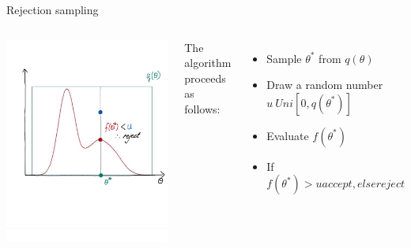\documentclass[compress]{beamer}
\begin{document}
\begin{frame}[label=sec-5-7]{Rejection sampling}
\begin{columns}[c] 
\includegraphics[width=.8\linewidth]{RS6.png}

The algorithm proceeds as follows:\\
\begin{itemize}
\item Sample $\theta^*$ from $q(\theta)$
\item Draw a random number $u ~ Uni[0, q(\theta^*)]$
\item Evaluate $f(\theta^*)$
\item If $f(\theta^*) > u accept, else reject$
\end{itemize}
\end{columns}
\end{frame}
\end{document}
